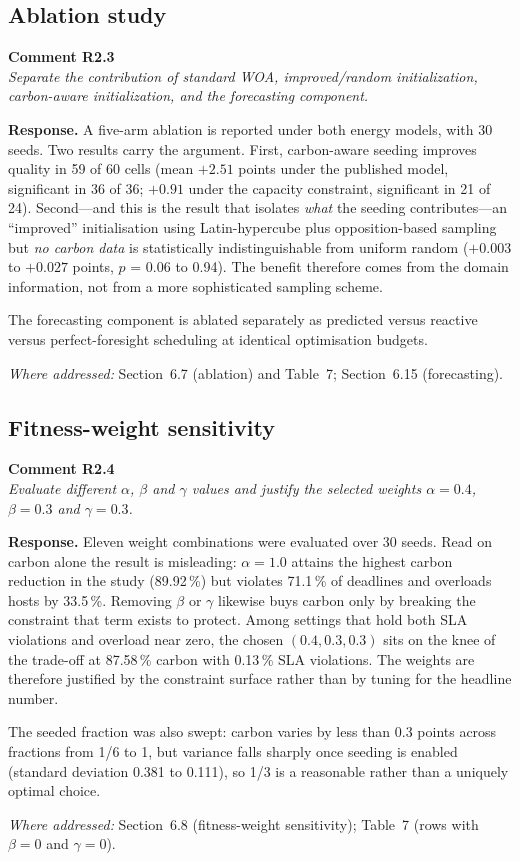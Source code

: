 \documentclass[11pt,a4paper]{article}
\newcommand{\rsp}[1]{\vspace{2pt}\noindent\textbf{Response.} #1\par\vspace{6pt}}
\newcommand{\rwhere}[1]{\noindent\textit{Where addressed:} #1\par\vspace{10pt}}
\newenvironment{revcomment}[1]
  {\begin{tcolorbox}[colback=gray!6,colframe=gray!45,boxrule=0.4pt,
     left=6pt,right=6pt,top=4pt,bottom=4pt]\textbf{#1}\\[2pt]\itshape\color{cmt}}
  {\end{tcolorbox}\vspace{4pt}}
\begin{document}
\subsection*{Ablation study}
\begin{revcomment}{Comment R2.3}
Separate the contribution of standard WOA, improved/random initialization,
carbon-aware initialization, and the forecasting component.
\end{revcomment}
\rsp{A five-arm ablation is reported under both energy models, with 30 seeds. Two
results carry the argument. First, carbon-aware seeding improves quality in 59 of
60 cells (mean $+2.51$ points under the published model, significant in 36 of 36;
$+0.91$ under the capacity constraint, significant in 21 of 24). Second---and this
is the result that isolates \emph{what} the seeding contributes---an ``improved''
initialisation using Latin-hypercube plus opposition-based sampling but \emph{no
carbon data} is statistically indistinguishable from uniform random ($+0.003$ to
$+0.027$ points, $p$ = 0.06 to 0.94). The benefit therefore comes from the domain
information, not from a more sophisticated sampling scheme.

The forecasting component is ablated separately as predicted versus reactive
versus perfect-foresight scheduling at identical optimisation budgets.}
\rwhere{Section~6.7 (ablation) and Table~7; Section~6.15 (forecasting).}

\subsection*{Fitness-weight sensitivity}
\begin{revcomment}{Comment R2.4}
Evaluate different $\alpha$, $\beta$ and $\gamma$ values and justify the selected
weights $\alpha = 0.4$, $\beta = 0.3$ and $\gamma = 0.3$.
\end{revcomment}
\rsp{Eleven weight combinations were evaluated over 30 seeds. Read on carbon alone
the result is misleading: $\alpha = 1.0$ attains the highest carbon reduction in
the study (89.92\,\%) but violates 71.1\,\% of deadlines and overloads hosts by
33.5\,\%. Removing $\beta$ or $\gamma$ likewise buys carbon only by breaking the
constraint that term exists to protect. Among settings that hold both SLA
violations and overload near zero, the chosen $(0.4, 0.3, 0.3)$ sits on the knee of
the trade-off at 87.58\,\% carbon with 0.13\,\% SLA violations. The weights are
therefore justified by the constraint surface rather than by tuning for the
headline number.

The seeded fraction was also swept: carbon varies by less than 0.3 points across
fractions from 1/6 to 1, but variance falls sharply once seeding is enabled
(standard deviation 0.381 to 0.111), so 1/3 is a reasonable rather than a uniquely
optimal choice.}
\rwhere{Section~6.8 (fitness-weight sensitivity); Table~7 (rows with $\beta=0$ and $\gamma=0$).}
\end{document}
